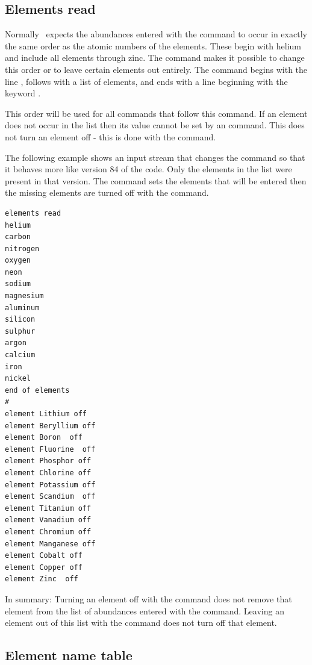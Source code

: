 \subsection{Elements read}

Normally \Cloudy\ expects the abundances entered with the
 command
to occur in exactly the same order as the atomic numbers of the elements.
These begin with helium and include all elements through zinc.
The  command makes it possible
to change this order or to leave certain
elements out entirely.
The command begins with the line ,
follows with a list of elements, and ends with a line beginning with the
keyword .

This order will be used for all  commands
that follow this command.
If an element does not occur in the list then its value cannot
be set by an  command.
This does not turn an element off - this
is done with the  command.

The following example shows an input stream that changes the
command so that it behaves more like version 84 of the code.
Only the
elements in the list were present in that version.
The  command
sets the elements that will be entered then the missing elements are turned
off with the  command.
\begin{verbatim}
elements read
helium
carbon
nitrogen
oxygen
neon
sodium
magnesium
aluminum
silicon
sulphur
argon
calcium
iron
nickel
end of elements
#
element Lithium off
element Beryllium off
element Boron  off
element Fluorine  off
element Phosphor off
element Chlorine off
element Potassium off
element Scandium  off
element Titanium off
element Vanadium off
element Chromium off
element Manganese off
element Cobalt off
element Copper off
element Zinc  off
\end{verbatim}

In summary:  Turning an element off with the
 command does
not remove that element from the list of abundances entered with the
 command.
Leaving an element out of this list with the
 command does not turn off that element.

\subsection{Element name table}

